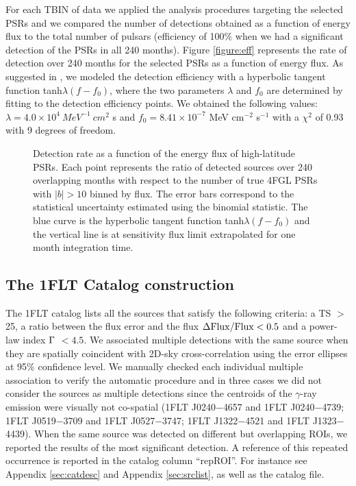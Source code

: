 \documentclass{aastex62}
\begin{document}
For each TBIN of data we applied the analysis procedures targeting the selected PSRs and we compared the number of detections obtained as a function of energy flux to the total number of pulsars (efficiency of 100$\%$ when we had a significant detection of the PSRs in all 240 months). Figure \ref{figure:eff} represents the rate of detection over 240 months for the selected PSRs as a function of energy flux. As suggested in \citet{principe2018first}, we modeled the detection efficiency with a hyperbolic tangent function tanh$\lambda(f - f_0)$,  where the two parameters $\lambda$ and $f_0$ are determined by fitting to the detection efficiency points. We obtained the following values: $\lambda =  4.0 \times 10^4 ~MeV^{-1}~cm^{2}$ s and $f_0=8.41 \times 10^{-7}$ MeV cm$^{-2}$ s$^{-1}$ with a $\chi^2$ of 0.93 with 9 degrees of freedom.

\begin{figure}[hbt!]
 \caption{Detection rate as a function of the energy flux of high-latitude PSRs. Each point represents the ratio of detected sources over 240 overlapping months with respect to the number of true 4FGL PSRs with $|b|>10$ binned by flux. The error bars correspond to the statistical uncertainty estimated using the binomial statistic. The blue curve is the hyperbolic tangent function tanh$\lambda(f - f_0)$ and the vertical line is at sensitivity flux limit extrapolated for one month integration time.}
\end{figure}\label{figure:eff}


\subsection{The 1FLT Catalog construction}\label{subsec:catCon}
The 1FLT catalog lists all the sources that satisfy the following criteria: a TS $>$ 25, a ratio between the flux error and the flux $\rm \Delta Flux/Flux < 0.5$ and a power-law index $\rm \Gamma$ $<4.5$. 
We associated multiple detections with the same source when they are  spatially coincident with 2D-sky cross-correlation using the error ellipses at 95\% confidence level. We manually checked each individual multiple association to verify the automatic procedure and in three cases we did not consider the sources as multiple detections since the centroids of the $\gamma$-ray emission were visually not co-spatial (1FLT J0240$-$4657 and 1FLT J0240$-$4739; 1FLT J0519$-$3709 and 1FLT J0527$-$3747; 1FLT J1322$-$4521 and 1FLT J1323$-$4439).
When the same source was detected on different but overlapping ROIs, we reported the results of the most significant detection. A reference of this repeated occurrence is reported in the catalog column ``repROI''. For instance see Appendix \ref{sec:catdesc} and Appendix \ref{sec:srclist}, as well as the catalog file.
\end{document}
